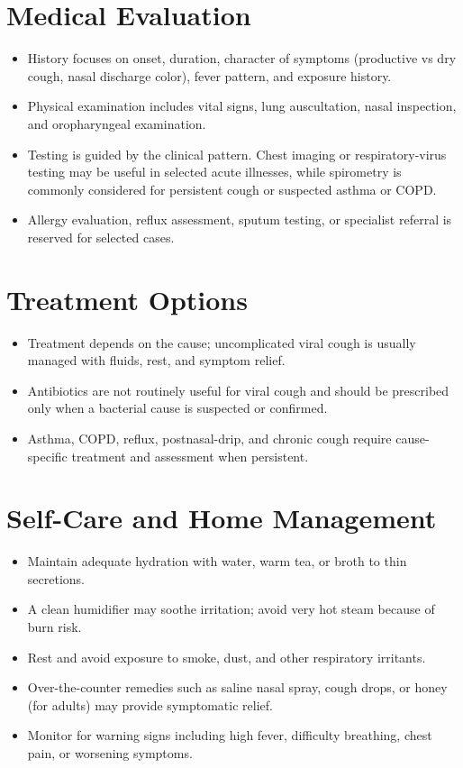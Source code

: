 \section*{Medical Evaluation}
\begin{itemize}
  \item History focuses on onset, duration, character of symptoms (productive vs dry cough, nasal discharge color), fever pattern, and exposure history.
  \item Physical examination includes vital signs, lung auscultation, nasal inspection, and oropharyngeal examination.
  \item Testing is guided by the clinical pattern. Chest imaging or respiratory-virus testing may be useful in selected acute illnesses, while spirometry is commonly considered for persistent cough or suspected asthma or COPD.
  \item Allergy evaluation, reflux assessment, sputum testing, or specialist referral is reserved for selected cases.
\end{itemize}

\section*{Treatment Options}
\begin{itemize}
  \item Treatment depends on the cause; uncomplicated viral cough is usually managed with fluids, rest, and symptom relief.
  \item Antibiotics are not routinely useful for viral cough and should be prescribed only when a bacterial cause is suspected or confirmed.
  \item Asthma, COPD, reflux, postnasal-drip, and chronic cough require cause-specific treatment and assessment when persistent.
\end{itemize}

\section*{Self-Care and Home Management}
\begin{itemize}
  \item Maintain adequate hydration with water, warm tea, or broth to thin secretions.
  \item A clean humidifier may soothe irritation; avoid very hot steam because of burn risk.
  \item Rest and avoid exposure to smoke, dust, and other respiratory irritants.
  \item Over-the-counter remedies such as saline nasal spray, cough drops, or honey (for adults) may provide symptomatic relief.
  \item Monitor for warning signs including high fever, difficulty breathing, chest pain, or worsening symptoms.
\end{itemize}

